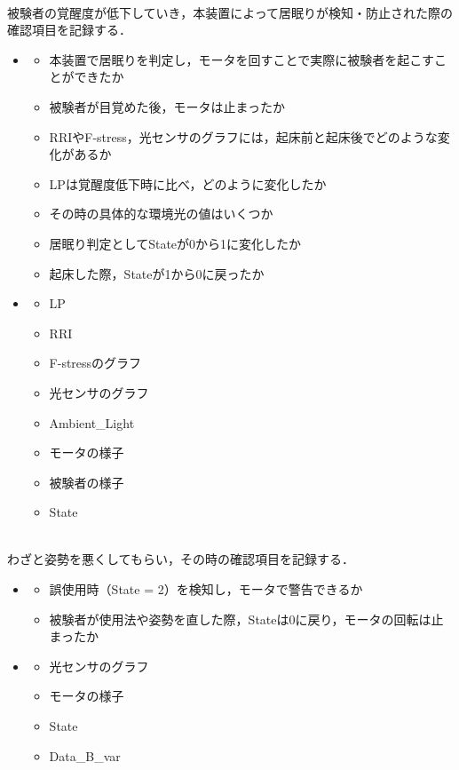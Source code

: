 \\
被験者の覚醒度が低下していき，本装置によって居眠りが検知・防止された際の確認項目を記録する．
\begin{itemize}
\item {}
\begin{itemize}
\item 本装置で居眠りを判定し，モータを回すことで実際に被験者を起こすことができたか
\item 被験者が目覚めた後，モータは止まったか
\item RRIやF-stress，光センサのグラフには，起床前と起床後でどのような変化があるか
\item LPは覚醒度低下時に比べ，どのように変化したか
\item その時の具体的な環境光の値はいくつか
\item 居眠り判定としてStateが0から1に変化したか
\item 起床した際，Stateが1から0に戻ったか
\end{itemize}
\item {}
\begin{itemize}
\item LP
\item RRI
\item F-stressのグラフ
\item 光センサのグラフ
\item Ambient\_Light
\item モータの様子
\item 被験者の様子
\item State
\end{itemize}
\end{itemize}

\\
わざと姿勢を悪くしてもらい，その時の確認項目を記録する．
\begin{itemize}
\item {}
\begin{itemize}
\item 誤使用時（State = 2）を検知し，モータで警告できるか
\item 被験者が使用法や姿勢を直した際，Stateは0に戻り，モータの回転は止まったか
\end{itemize}
\item {}
\begin{itemize}
\item 光センサのグラフ
\item モータの様子
\item State
\item Data\_B\_var
\end{itemize}
\end{itemize}


